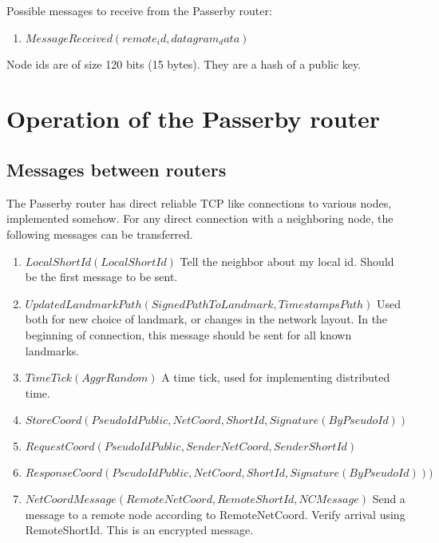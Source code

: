 \documentclass{amsart}
\theoremstyle{definition}
\theoremstyle{remark}
\numberwithin{equation}{section}
\begin{document}
Possible messages to receive from the Passerby router:
\begin{enumerate}
  \item $MessageReceived (remote_id, datagram_data)$
\end{enumerate}

Node ids are of size 120 bits (15 bytes). They are a hash of a public key.

\section{Operation of the Passerby router}

\subsection{Messages between routers}

The Passerby router has direct reliable TCP like connections to various nodes,
implemented somehow. For any direct connection with a neighboring node, the
following messages can be transferred.



\begin{enumerate}
  \item $LocalShortId(LocalShortId)$
      Tell the neighbor about my local id. Should be the first message to be
      sent.
  \item $UpdatedLandmarkPath(SignedPathToLandmark, TimestampsPath)$
      Used both for new choice of landmark, or changes in the network layout.
      In the beginning of connection, this message should be sent for all known
      landmarks. 
  \item $TimeTick(AggrRandom)$
      A time tick, used for implementing distributed time.

  \item $StoreCoord(PseudoIdPublic, NetCoord, ShortId, Signature(By PseudoId))$
  \item $RequestCoord(PseudoIdPublic, SenderNetCoord, SenderShortId)$
  \item $ResponseCoord(PseudoIdPublic, NetCoord, ShortId , Signature(By PseudoId)))$ 

  \item $NetCoordMessage(RemoteNetCoord, RemoteShortId, NCMessage)$
    Send a message to a remote node according to RemoteNetCoord. Verify arrival
    using RemoteShortId. This is an encrypted message.
\end{enumerate}
\end{document}
